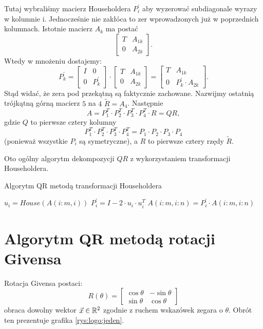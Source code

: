 \documentclass[12pt,a4paper]{report}
\newcommand{\mx}[1]{{#1}}
\begin{document}
\begin{example}
Tutaj wybraliśmy macierz Householdera $P_{i}^{'}$ aby wyzerować subdiagonale wyrazy w kolumnie i. Jednocześnie nie zakłóca to zer wprowadzonych już w poprzednich kolumnach. Istotnie macierz $\mx{A}_{k}$ ma postać
$$
\begin{bmatrix}
T & A_{1k} \\
0 & A_{2k}
\end{bmatrix}.
$$
Wtedy w mnożeniu dostajemy:
$$
\mx{P}_{k}^{'}= \begin{bmatrix}
I & 0 \\
0 & P_{k}^{'}
\end{bmatrix} \cdot \begin{bmatrix}
T & A_{1k} \\
0 & A_{2k}
\end{bmatrix} = \begin{bmatrix}
T & A_{1k} \\
0 & P_{k}^{'}\cdot A_{2k}
\end{bmatrix}.
$$
Stąd widać, że zera pod przekątną są faktycznie zachowane.
Nazwijmy ostatnią trójkątną górną macierz $5$ na $4$ $\mx{\tilde{R}}=A_{4}$. Następnie 
$$
 \mx{A} = \mx{P}_{1}^{T}\cdot \mx{P}_{2}^{T}\cdot \mx{P}_{3}^{T}\cdot \mx{P}_{4}^{T}\cdot \mx{R} = \mx{QR},
$$
gdzie $\mx{Q}$ to pierwsze cztery kolumny 
$$
\mx{P}_{1}^{T}\cdot \mx{P}_{2}^{T}\cdot \mx{P}_{3}^{T}\cdot \mx{P}_{4}^{T} = \mx{P}_{1}\cdot \mx{P}_{2}\cdot \mx{P}_{3}\cdot \mx{P}_{4}
$$
(ponieważ wszystkie $\mx{P}_{i}$ są symetryczne), a $\mx{R}$ to pierwsze cztery rzędy $\mx{\tilde{R}}$.
\end{example}
Oto ogólny algorytm dekompozycji $\mx{QR}$ z wykorzystaniem transformacji Householdera.

\begin{algorithm}
\caption{Algorytm QR metodą transformacji Householdera}
\begin{algorithmic}
	\State $u_{i} = House(A(i:m,i))$
	\State $\mx{P_{i}^{'}} = \mx{I} - 2\cdot u_{i}\cdot u_{i}^{T}$
	\State $\mx{A}(i:m, i:n) = \mx{P}_{i}^{'}\cdot \mx{A}(i:m, i:n)$	
\EndFor
\end{algorithmic}
\end{algorithm}
 
\section{Algorytm QR metodą rotacji Givensa}
\begin{remark}
Rotacja Givensa postaci: 
$$
R(\theta) = \begin{bmatrix}
\cos\theta & -\sin\theta \\
\sin\theta & \cos\theta
\end{bmatrix}
$$
obraca dowolny wektor $\vec{x}\in \mathbb{R}^{2}$ zgodnie z ruchem wskazówek zegara o $\theta$. Obrót ten prezentuje grafika \ref{rys:logo:jeden}.
\end{remark}
\end{document}
